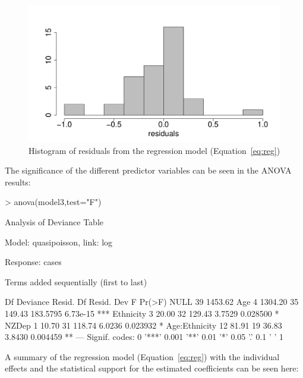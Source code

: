 \documentclass{article}
\begin{document}
\begin{figure}[h!]
\begin{center}
\includegraphics{draftfinalreport-035}
\end{center}
\caption{Histogram of residuals from the regression model (Equation~\ref{eq:reg})}
\label{fig:resid}
\end{figure}
The significance of the different predictor variables can be seen in the ANOVA results:

\begin{Schunk}
\begin{Sinput}
> anova(model3,test="F")
\end{Sinput}
\begin{Soutput}
Analysis of Deviance Table

Model: quasipoisson, link: log

Response: cases

Terms added sequentially (first to last)


              Df Deviance Resid. Df Resid. Dev        F   Pr(>F)    
NULL                             39    1453.62                      
Age            4  1304.20        35     149.43 183.5795 6.73e-15 ***
Ethnicity      3    20.00        32     129.43   3.7529 0.028500 *  
NZDep          1    10.70        31     118.74   6.0236 0.023932 *  
Age:Ethnicity 12    81.91        19      36.83   3.8430 0.004459 ** 
---
Signif. codes:  0 '***' 0.001 '**' 0.01 '*' 0.05 '.' 0.1 ' ' 1
\end{Soutput}
\end{Schunk}

A summary of the regression model (Equation~\ref{eq:reg}) with the individual effects and the statistical support for the estimated coefficients can be seen here:
\end{document}
